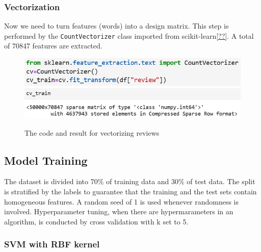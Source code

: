 \documentclass[10pt,twocolumn,letterpage]{article}
\begin{document}
	\subsubsection{Vectorization}
	Now we need to turn features (words) into a design matrix. This step is performed by the \texttt{CountVectorizer} class imported from scikit-learn\ref{??}. A total of 70847 features are extracted.
	\begin{figure}[H]
		\includegraphics[width = \columnwidth]{vectorization}
		\includegraphics[width = \columnwidth]{vec_result}
		\caption{The code and result for vectorizing reviews}
	\end{figure}
	
	\subsection{Model Training}
	The dataset is divided into 70\% of training data and 30\% of test data. The split is stratified by the labels to guarantee that the training and the test sets contain homogeneous features. A random seed of 1 is used whenever randomness is involved. Hyperparameter tuning, when there are hypermarameters in an algorithm, is conducted by cross validation with k set to 5. 
	\subsubsection{SVM with RBF kernel}
\end{document}
